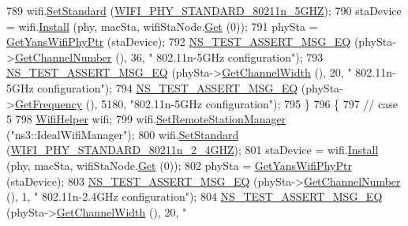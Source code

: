 \begin{DoxyCode}
789     wifi.\hyperlink{classns3_1_1WifiHelper_aa54f3e61527ef8de318d310045bc5dfd}{SetStandard} (\hyperlink{group__wifi_gga1299834f4e1c615af3ca738033b76a49aaabe94a0be4668583c42595437b4a6c0}{WIFI\_PHY\_STANDARD\_80211n\_5GHZ});
790     staDevice = wifi.\hyperlink{classns3_1_1WifiHelper_a451b3d33fa1497c22f06c5451f57a127}{Install} (phy, macSta, wifiStaNode.\hyperlink{classns3_1_1NodeContainer_a9ed96e2ecc22e0f5a3d4842eb9bf90bf}{Get} (0));
791     phySta = \hyperlink{classSetChannelFrequencyTest_aa30a0a39f98c2d825152681ba8b9f4e1}{GetYansWifiPhyPtr} (staDevice);
792     \hyperlink{group__testing_ga2a9d78cffb3db8e867c35fff0b698cf5}{NS\_TEST\_ASSERT\_MSG\_EQ} (phySta->\hyperlink{classns3_1_1WifiPhy_a5cf0ccf06109ace61db51c83e91b7e8d}{GetChannelNumber} (), 36, \textcolor{stringliteral}{"
      802.11n-5GHz configuration"});
793     \hyperlink{group__testing_ga2a9d78cffb3db8e867c35fff0b698cf5}{NS\_TEST\_ASSERT\_MSG\_EQ} (phySta->\hyperlink{classns3_1_1WifiPhy_a4a5d5009b3b3308f2baeed42a2007189}{GetChannelWidth} (), 20, \textcolor{stringliteral}{"
      802.11n-5GHz configuration"});
794     \hyperlink{group__testing_ga2a9d78cffb3db8e867c35fff0b698cf5}{NS\_TEST\_ASSERT\_MSG\_EQ} (phySta->\hyperlink{classns3_1_1WifiPhy_ad2508d94faf22d690d6b8b4367934fd1}{GetFrequency} (), 5180, \textcolor{stringliteral}{"802.11n-5GHz
       configuration"});
795   \}
796   \{
797     \textcolor{comment}{// case 5}
798     \hyperlink{classns3_1_1WifiHelper}{WifiHelper} wifi;
799     wifi.\hyperlink{classns3_1_1WifiHelper_a3d01b178aeb2de246ab5a3aa5638ce24}{SetRemoteStationManager} (\textcolor{stringliteral}{"ns3::IdealWifiManager"});
800     wifi.\hyperlink{classns3_1_1WifiHelper_aa54f3e61527ef8de318d310045bc5dfd}{SetStandard} (\hyperlink{group__wifi_gga1299834f4e1c615af3ca738033b76a49a6e449a5ca14fc7c0eb36064ce04a5192}{WIFI\_PHY\_STANDARD\_80211n\_2\_4GHZ});
801     staDevice = wifi.\hyperlink{classns3_1_1WifiHelper_a451b3d33fa1497c22f06c5451f57a127}{Install} (phy, macSta, wifiStaNode.\hyperlink{classns3_1_1NodeContainer_a9ed96e2ecc22e0f5a3d4842eb9bf90bf}{Get} (0));
802     phySta = \hyperlink{classSetChannelFrequencyTest_aa30a0a39f98c2d825152681ba8b9f4e1}{GetYansWifiPhyPtr} (staDevice);
803     \hyperlink{group__testing_ga2a9d78cffb3db8e867c35fff0b698cf5}{NS\_TEST\_ASSERT\_MSG\_EQ} (phySta->\hyperlink{classns3_1_1WifiPhy_a5cf0ccf06109ace61db51c83e91b7e8d}{GetChannelNumber} (), 1, \textcolor{stringliteral}{"
      802.11n-2.4GHz configuration"});
804     \hyperlink{group__testing_ga2a9d78cffb3db8e867c35fff0b698cf5}{NS\_TEST\_ASSERT\_MSG\_EQ} (phySta->\hyperlink{classns3_1_1WifiPhy_a4a5d5009b3b3308f2baeed42a2007189}{GetChannelWidth} (), 20, \textcolor{stringliteral}{"
}
\end{DoxyCode}
